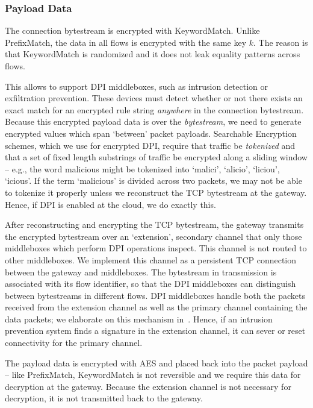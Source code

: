 \subsubsection{Payload Data} 
The connection bytestream is encrypted with KeywordMatch. Unlike PrefixMatch, the data in all flows is encrypted with the same key $k$. The reason is that KeywordMatch is randomized and it does not leak equality patterns across flows.

This allows \sys to support DPI middleboxes, such as intrusion detection or exfiltration prevention.
These devices must detect whether or not there exists an exact match for an encrypted rule string {\it anywhere} in the connection bytestream.
Because this encrypted payload data is over the {\it bytestream}, we need to generate encrypted values which span `between' packet payloads. 
Searchable Encryption schemes, which we use for encrypted DPI, require that traffic be {\it tokenized} and that a set of fixed length substrings of traffic be encrypted along a sliding window -- e.g., the word malicious might be tokenized into {`malici', `alicio', `liciou', `icious'}.
If the term `malicious' is divided across two packets, we may not be able to tokenize it properly unless we reconstruct the TCP bytestream at the gateway. Hence, if DPI is enabled at the cloud, we do exactly this.

After reconstructing and encrypting the TCP bytestream, the gateway transmits the encrypted bytestream over 
an `extension', secondary channel that only those middleboxes which perform DPI operations inspect. 
This channel is not routed to other middleboxes. We implement this channel as a persistent TCP connection 
between the gateway and middleboxes. The bytestream in transmission is associated with its flow identifier, 
so that the DPI middleboxes can distinguish between bytestreams in different flows.
DPI middleboxes handle both the packets received from the extension channel as well as the primary channel containing the data packets; we elaborate on this mechanism in~\cite{blindbox}.
Hence, if an intrusion prevention system finds a signature in the extension channel, it can sever or reset connectivity for the primary channel.

 The payload data is encrypted with AES and placed back into the packet payload -- like PrefixMatch, KeywordMatch is not reversible and we require this data for decryption at the gateway.
Because the extension channel is not necessary for decryption, it is not transmitted back to the gateway.

